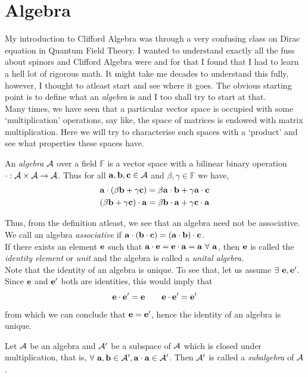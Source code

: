 \section{Algebra}
My introduction to Clifford Algebra was through a very confusing class on Dirac equation in Quantum Field Theory. I wanted to understand exactly all the fuss about spinors and Clifford Algebra were and for that I found that I had to learn a hell lot of rigorous math. It might take me decades to understand this fully, however, I thought to atleast start and see where it goes. The obvious starting point is to define what an \textit{algebra} is and I too shall try to start at that. \\[0.3cm]
Many times, we have seen that a particular vector space is occupied with some `multiplication' operations, say like, the space of matrices is endowed with matrix multiplication. Here we will try to characterise such spaces with a `product' and see what properties these spaces have. 
\begin{definition}[Algebra]
    An \textit{algebra} $\mathcal A$ over a field $\mathbb{F}$ is a vector space with a bilinear binary operation $\cdot:\mathcal A\times \mathcal A\rightarrow \mathcal A$. Thus for all $\vb{a}, \vb{b}, \vb{c}\in \mathcal A$ and $\beta,\gamma\in \mathbb{F}$ we have,
    \begin{align*}
        \vb{a}\cdot (\beta \vb{b} + \gamma \vb{c}) &= \beta \vb{a}\cdot \vb{b} + \gamma \vb{a}\cdot \vb{c}\\
  (\beta \vb{b} + \gamma \vb{c})\cdot\vb{a} &= \beta \vb{b}\cdot \vb{a} + \gamma \vb{c}\cdot \vb{a}
    \end{align*}
\end{definition}
Thus, from the definition atleast, we see that an algebra need not be associative. We call an algebra \textit{associative} if $\vb{a}\cdot (\vb{b}\cdot \vb{c}) = (\vb{a}\cdot \vb{b})\cdot \vb{c}$.\\[0.2cm]
If there exists an element $\vb{e}$ such that $\vb{a}\cdot \vb{e} = \vb{e}\cdot \vb{a} = \vb{a}\ \forall \ \vb{a}$, then $\vb{e}$ is called the \textit{identity element} or \textit{unit} and the algebra is called a \textit{unital algebra}.\\[0.2cm] Note that the identity of an algebra is unique. To see that, let us assume $\exists\ \vb{e}, \vb{e}'$. Since $\vb{e}$ and $\vb{e}'$ both are identities, this would imply that
$$\vb{e}\cdot\vb{e}' = \vb{e}\qquad \vb{e}\cdot\vb{e}' = \vb{e}'$$
from which we can conclude that $\vb{e}=\vb{e}'$, hence the identity of an algebra is unique. 
\begin{definition}
    Let $\mathcal A$ be an algebra and $\mathcal A'$ be a subspace of $\mathcal A$ which is closed under multiplication, that is, $\forall \ \vb{a}, \vb{b}\in \mathcal A', \vb{a}\cdot\vb{a}\in \mathcal A'$. Then $\mathcal A'$ is called a \textit{subalgebra} of $\mathcal A$.
\end{definition}